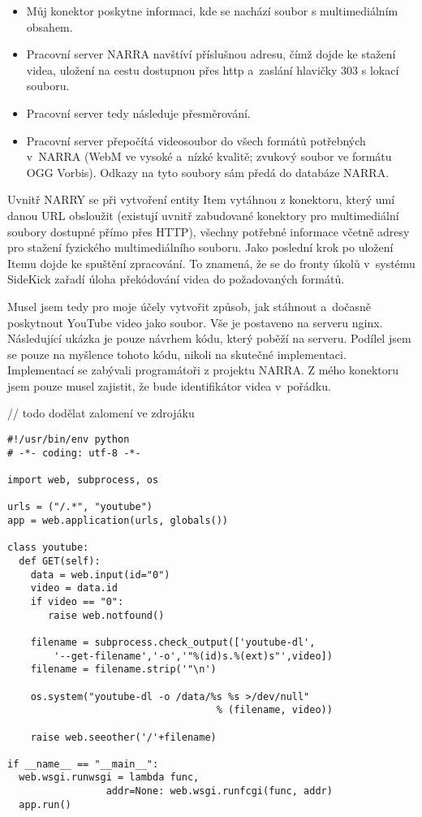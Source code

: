 \begin{itemize}
\item Můj konektor poskytne informaci, kde se nachází soubor s multimediálním obsahem.
\item Pracovní server NARRA navštíví příslušnou adresu, čímž dojde ke stažení videa, uložení na cestu dostupnou přes http a~zaslání hlavičky 303 s lokací souboru.
\item Pracovní server tedy následuje přesměrování. %
\item Pracovní server přepočítá videosoubor do všech formátů potřebných v~NARRA (WebM ve vysoké a~nízké kvalitě; zvukový soubor ve formátu OGG Vorbis). Odkazy na tyto soubory sám předá do databáze NARRA.
\end{itemize}

\par Uvnitř NARRY se při vytvoření entity Item vytáhnou z konektoru, který umí danou URL obsloužit (existují uvnitř zabudované konektory pro multimediální soubory dostupné přímo přes HTTP), všechny potřebné informace včetně adresy pro stažení fyzického multimediálního souboru. Jako poslední krok po uložení Itemu dojde ke spuštění zpracování. To znamená, že se do fronty úkolů v~systému SideKick zařadí úloha překódování videa do požadovaných formátů.
\par Musel jsem tedy pro moje účely vytvořit způsob, jak stáhnout a~dočasně poskytnout YouTube video jako soubor. Vše je postaveno na serveru nginx. Následující ukázka je pouze návrhem kódu, který poběží na serveru. Podílel jsem se pouze na myšlence tohoto kódu, nikoli na skutečné implementaci. Implementací se zabývali programátoři z projektu NARRA. Z mého konektoru jsem pouze musel zajistit, že bude identifikátor videa v~pořádku.

// todo dodělat zalomení ve zdrojáku

\begin{verbatim}
#!/usr/bin/env python
# -*- coding: utf-8 -*-

import web, subprocess, os

urls = ("/.*", "youtube")
app = web.application(urls, globals())

class youtube:
  def GET(self):
    data = web.input(id="0")
    video = data.id
    if video == "0":
       raise web.notfound()
 
    filename = subprocess.check_output(['youtube-dl',
        '--get-filename','-o','"%(id)s.%(ext)s"',video])
    filename = filename.strip('"\n')
    
    os.system("youtube-dl -o /data/%s %s >/dev/null" 
                                    % (filename, video))
 
    raise web.seeother('/'+filename)
 
if __name__ == "__main__":
  web.wsgi.runwsgi = lambda func, 
                 addr=None: web.wsgi.runfcgi(func, addr)
  app.run()
\end{verbatim}